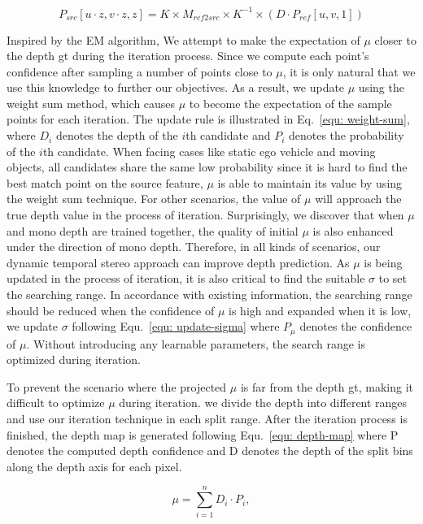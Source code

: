 \documentclass[letterpaper]{article} \usepackage[]{aaai23}  \usepackage{times}  \usepackage{helvet}  \usepackage{courier}  \usepackage[hyphens]{url}  \usepackage{graphicx} \urlstyle{rm} \def\UrlFont{\rm}  \usepackage{natbib}  \usepackage{caption} \frenchspacing  \setlength{\pdfpagewidth}{8.5in} \setlength{\pdfpageheight}{11in} \usepackage{algorithm}
\begin{document}
\begin{equation}
\label{equ: homowarping}
    P_{src}[u\cdot z, v \cdot z, z] = K \times M_{ref2src} \times K^{-1} \times (D \cdot P_{ref}[u, v, 1])
\end{equation}

Inspired by the EM algorithm, We attempt to make the expectation of $\mu$ closer to the depth gt during the iteration process. Since we compute each point's confidence after sampling a number of points close to $\mu$, it is only natural that we use this knowledge to further our objectives. As a result, we update $\mu$ using the weight sum method, which causes $\mu$ to become the expectation of the sample points for each iteration. The update rule is illustrated in Eq.~\ref{equ: weight-sum}, where $D_i$ denotes the depth of the $i$th candidate and $P_i$ denotes the probability of the $i$th candidate. When facing cases like static ego vehicle and moving objects, all candidates share the same low probability since it is hard to find the best match point on the source feature, $\mu$ is able to maintain its value by using the weight sum technique. For other scenarios, the value of $\mu$ will approach the true depth value in the process of iteration. Surprisingly, we discover that when $\mu$ and mono depth are trained together, the quality of initial $\mu$ is also enhanced under the direction of mono depth. Therefore, in all kinds of scenarios, our dynamic temporal stereo approach can improve depth prediction. As $\mu$ is being updated in the process of iteration, it is also critical to find the suitable $\sigma$ to set the searching range. In accordance with existing information, the searching range should be reduced when the confidence of $\mu$ is high and expanded when it is low, we update $\sigma$ following Equ.~\ref{equ: update-sigma} where $P_{\mu}$ denotes the confidence of $\mu$. Without introducing any learnable parameters, the search range is optimized during iteration. 

To prevent the scenario where the projected $\mu$ is far from the depth gt, making it difficult to optimize $\mu$ during iteration. we divide the depth into different ranges and use our iteration technique in each split range. After the iteration process is finished, the depth map is generated following  Equ.~\ref{equ: depth-map} where P denotes the computed depth confidence and D denotes the depth of the split bins along the depth axis for each pixel. 

\begin{equation}
\label{equ: weight-sum}
    \mu = \sum_{i=1}^n D_i \cdot P_i,
\end{equation}
\end{document}

